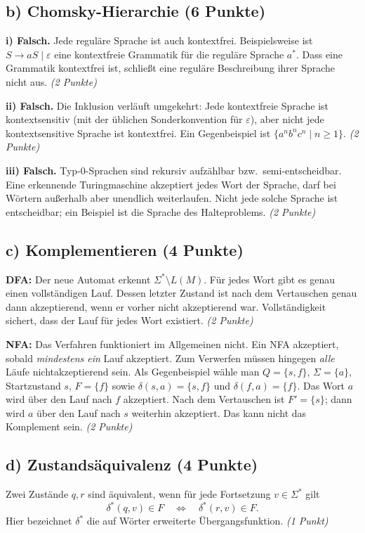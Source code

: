 \documentclass[11pt,a4paper]{article}
\begin{document}
\subsection*{b) Chomsky-Hierarchie (6 Punkte)}
\textbf{i) Falsch.} Jede reguläre Sprache ist auch kontextfrei.
Beispielsweise ist $S\to aS\mid\varepsilon$ eine kontextfreie Grammatik
für die reguläre Sprache $a^*$. Dass eine Grammatik kontextfrei ist,
schließt eine reguläre Beschreibung ihrer Sprache nicht aus.
\textit{(2 Punkte)}

\textbf{ii) Falsch.} Die Inklusion verläuft umgekehrt: Jede kontextfreie
Sprache ist kontextsensitiv (mit der üblichen Sonderkonvention für
$\varepsilon$), aber nicht jede kontextsensitive Sprache ist kontextfrei.
Ein Gegenbeispiel ist $\{a^nb^nc^n\mid n\geq1\}$.
\textit{(2 Punkte)}

\textbf{iii) Falsch.} Typ-0-Sprachen sind rekursiv aufzählbar bzw.\
semi-entscheidbar. Eine erkennende Turingmaschine akzeptiert jedes Wort der
Sprache, darf bei Wörtern außerhalb aber unendlich weiterlaufen.
Nicht jede solche Sprache ist entscheidbar; ein Beispiel ist die Sprache
des Halteproblems. \textit{(2 Punkte)}

\subsection*{c) Komplementieren (4 Punkte)}
\textbf{DFA:} Der neue Automat erkennt $\Sigma^*\setminus L(M)$.
Für jedes Wort gibt es genau einen vollständigen Lauf. Dessen letzter
Zustand ist nach dem Vertauschen genau dann akzeptierend, wenn er vorher
nicht akzeptierend war. Vollständigkeit sichert, dass der Lauf für jedes
Wort existiert. \textit{(2 Punkte)}

\textbf{NFA:} Das Verfahren funktioniert im Allgemeinen nicht. Ein NFA
akzeptiert, sobald \emph{mindestens ein} Lauf akzeptiert. Zum Verwerfen
müssen hingegen \emph{alle} Läufe nichtakzeptierend sein.
Als Gegenbeispiel wähle man $Q=\{s,f\}$, $\Sigma=\{a\}$, Startzustand $s$,
$F=\{f\}$ sowie $\delta(s,a)=\{s,f\}$ und $\delta(f,a)=\{f\}$.
Das Wort $a$ wird über den Lauf nach $f$ akzeptiert. Nach dem Vertauschen
ist $F'=\{s\}$; dann wird $a$ über den Lauf nach $s$ weiterhin akzeptiert.
Das kann nicht das Komplement sein. \textit{(2 Punkte)}

\subsection*{d) Zustandsäquivalenz (4 Punkte)}
Zwei Zustände $q,r$ sind äquivalent, wenn für jede Fortsetzung
$v\in\Sigma^*$ gilt
\[
 \delta^*(q,v)\in F\quad\Longleftrightarrow\quad\delta^*(r,v)\in F.
\]
Hier bezeichnet $\delta^*$ die auf Wörter erweiterte Übergangsfunktion.
\textit{(1 Punkt)}
\end{document}
